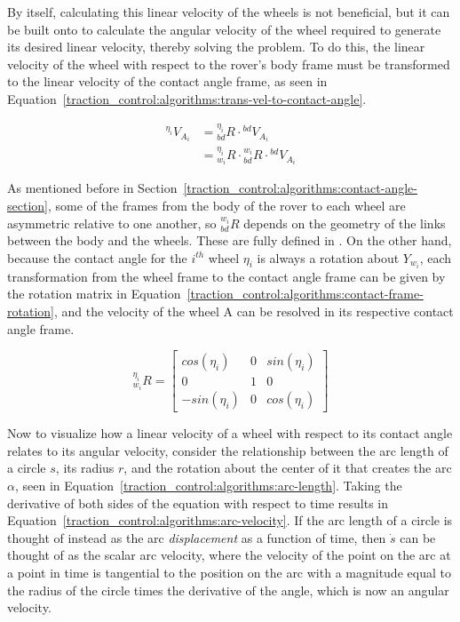 By itself, calculating this linear velocity of the wheels is not beneficial, but it can be built onto to calculate the angular velocity of the wheel required to generate its desired linear velocity, thereby solving the problem. To do this, the linear velocity of the wheel with respect to the rover's body frame must be transformed to the linear velocity of the contact angle frame, as seen in Equation~\ref{traction_control:algorithms:trans-vel-to-contact-angle}.

\begin{equation}\label{traction_control:algorithms:trans-vel-to-contact-angle}
	\begin{split}
		{}^{\eta_{i}}V_{A_{i}} & = {}^{\eta_{i}}_{bd}R \cdot {}^{bd}V_{A_{i}} \\
		& = {}^{\eta_{i}}_{w_{i}}R \cdot {}^{w_{i}}_{bd}R \cdot {}^{bd}V_{A_{i}}
	\end{split}
\end{equation}

As mentioned before in Section~\ref{traction_control:algorithms:contact-angle-section}, some of the frames from the body of the rover to each wheel are asymmetric relative to one another, so ${}^{w_{i}}_{bd}R$ depends on the geometry of the links between the body and the wheels. These are fully defined in \cite{tractl}. On the other hand, because the contact angle for the $i^{th}$ wheel $\eta_{i}$ is always a rotation about $Y_{w_{i}}$, each transformation from the wheel frame to the contact angle frame can be given by the rotation matrix in Equation~\ref{traction_control:algorithms:contact-frame-rotation}, and the velocity of the wheel A can be resolved in its respective contact angle frame.

\begin{equation}\label{traction_control:algorithms:contact-frame-rotation}
	{}^{\eta_{i}}_{w_{i}}R = \left[\begin{array}{ccc}
		cos(\eta_{i})  & 0 & sin(\eta_{i}) \\
		0              & 1 & 0 \\
		-sin(\eta_{i}) & 0 & cos(\eta_{i})
	\end{array}\right]
\end{equation}

Now to visualize how a linear velocity of a wheel with respect to its contact angle relates to its angular velocity, consider the relationship between the arc length of a circle $s$, its radius $r$, and the rotation about the center of it that creates the arc $\alpha$, seen in Equation~\ref{traction_control:algorithms:arc-length}. Taking the derivative of both sides of the equation with respect to time results in Equation~\ref{traction_control:algorithms:arc-velocity}. If the arc length of a circle is thought of instead as the arc \textit{displacement} as a function of time, then $\dot{s}$ can be thought of as the scalar arc velocity, where the velocity of the point on the arc at a point in time is tangential to the position on the arc with a magnitude equal to the radius of the circle times the derivative of the angle, which is now an angular velocity.

